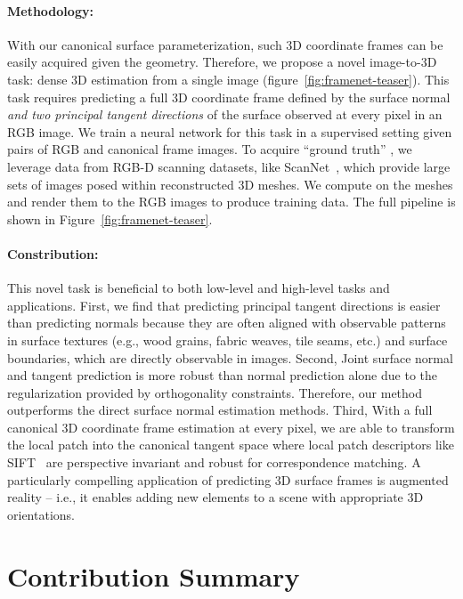 \paragraph*{Methodology:} With our canonical surface parameterization, such 3D coordinate frames can be easily acquired given the geometry. Therefore, we propose a novel image-to-3D task: dense 3D \cframe{} estimation from a single image (figure~\ref{fig:framenet-teaser}).  This task requires predicting a full 3D coordinate frame defined by the surface normal {\em and two principal tangent directions} of the surface observed at every pixel in an RGB image.  We train a neural network for this task in a supervised setting given pairs of RGB and canonical frame images.   To acquire ``ground truth'' \cframe{}, we leverage data from RGB-D scanning datasets, like ScanNet~\cite{dai2017scannet}, which provide large sets of images posed within reconstructed 3D meshes.  
We compute \cframe{} on the meshes and render them to the RGB images to produce training data. The full pipeline is shown in Figure~\ref{fig:framenet-teaser}.

\paragraph*{Constribution:} This novel task is beneficial to both low-level and high-level tasks and applications.  First, we find that predicting principal tangent directions is easier than predicting normals because they are often aligned with observable patterns in surface textures (e.g., wood grains, fabric weaves, tile seams, etc.) and surface boundaries, which are directly observable in images.  Second, Joint surface normal and tangent prediction is more robust than normal prediction alone due to the regularization provided by orthogonality constraints. Therefore, our method outperforms the direct surface normal estimation methods.  Third, With a full canonical 3D coordinate frame estimation at every pixel, we are able to transform the local patch into the canonical tangent space where local patch descriptors like SIFT~\cite{lowe2004distinctive} are perspective invariant and robust for correspondence matching. A particularly compelling application of predicting 3D surface frames is augmented reality -- i.e., it enables adding new elements to a scene with appropriate 3D orientations.

\section{Contribution Summary}
\label{intro:contribution}

